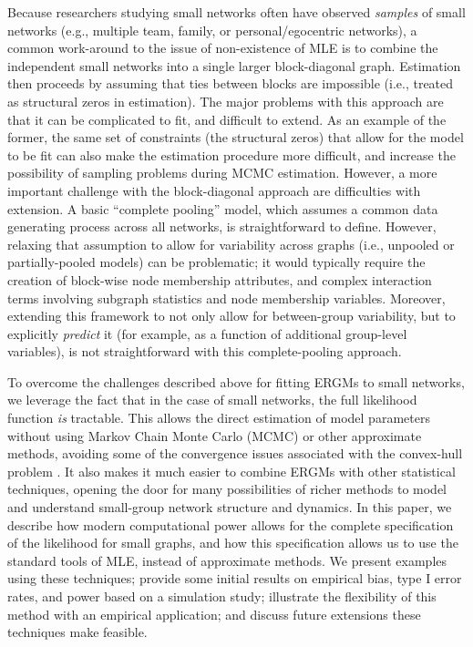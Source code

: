 \documentclass[review, nonatbib,doubleblind]{elsarticle/elsarticle}
\begin{document}
Because researchers studying small networks often have observed \textit{samples} of small networks (e.g., multiple team, family, or personal/egocentric networks), a common work-around to the issue of non-existence of MLE is to combine the independent small networks into a single larger block-diagonal graph. Estimation then proceeds by assuming that ties between blocks are impossible (i.e., treated as structural zeros in estimation). The major problems with this approach are that it can be complicated to fit, and difficult to extend. As an example of the former, the same set of constraints (the structural zeros) that allow for the model to be fit can also make the estimation procedure more difficult, and increase the possibility of sampling problems during MCMC estimation. However, a more important challenge with the block-diagonal approach are difficulties with extension. A basic ``complete pooling'' model, which assumes a common data generating process across all networks, is straightforward to define. However, relaxing that assumption to allow for variability across graphs (i.e., unpooled or partially-pooled models) can be problematic; it would typically require the creation of block-wise node membership attributes, and complex interaction terms involving subgraph statistics and node membership variables. Moreover, extending this framework to not only  allow for between-group variability, but to explicitly  \textit{predict} it (for example, as a function of additional group-level variables), is not straightforward with this complete-pooling approach.

To overcome the challenges described above for fitting ERGMs to small networks, we leverage the fact that in the case of small networks, the full likelihood function \textit{is} tractable. This allows the direct estimation of model parameters without using Markov Chain Monte Carlo (MCMC) or other approximate methods, avoiding some of the convergence issues associated with the convex-hull problem \cite{Handcock2003}. It also makes it much easier to combine ERGMs with other statistical techniques, opening the door for many possibilities of richer methods to model and understand small-group network structure and dynamics. In this paper, we describe how modern computational power allows for the complete specification of the likelihood for small graphs, and how this specification allows us to use the standard tools of MLE, instead of approximate methods. We present examples using these techniques; provide some initial results on empirical bias, type I error rates, and power based on a simulation study; illustrate the flexibility of this method with an empirical application; and discuss future extensions these techniques make feasible.
\end{document}

